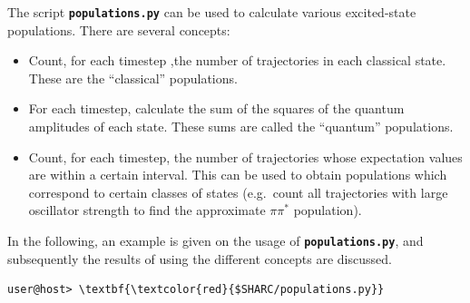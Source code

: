 \documentclass[a4paper,11pt,DIV=15,openany]{scrbook}
\newcommand{\ttt}[1]{\textbf{\texttt{#1}}}
\begin{document}
The script \ttt{populations.py} can be used to calculate various excited-state populations. There are several concepts:
\begin{itemize}
  \item Count, for each timestep ,the number of trajectories in each classical state. These are the ``classical'' populations.
  \item For each timestep, calculate the sum of the squares of the quantum amplitudes of each state. These sums are called the ``quantum'' populations.
  \item Count, for each timestep, the number of trajectories whose expectation values are within a certain interval. This can be used to obtain populations which correspond to certain classes of states (e.g.\ count all trajectories with large oscillator strength to find the approximate $\pi\pi^*$ population).
\end{itemize}

In the following, an example is given on the usage of \ttt{populations.py}, and subsequently the results of using the different concepts are discussed.
\begin{Verbatim}[commandchars=\\\{\}]
user@host> \textbf{\textcolor{red}{$SHARC/populations.py}}
\end{Verbatim}
\end{document}
